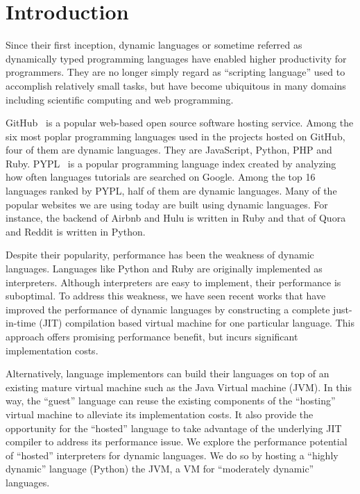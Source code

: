 \chapter{Introduction}
\label{chp:ch1-intro}

Since their first inception, dynamic languages or sometime referred as dynamically typed programming languages have enabled higher productivity for programmers.
They are no longer simply regard as ``scripting language'' used to accomplish relatively small tasks,
but have become ubiquitous in many domains including scientific computing and web programming.

GitHub~\cite{github} is a popular web-based open source software hosting service.
Among the six most poplar programming languages used in the projects hosted on GitHub, four of them are dynamic languages.
They are JavaScript, Python, PHP and Ruby.
PYPL~\cite{pypl} is a popular programming language index created by analyzing how often languages tutorials are searched on Google.
Among the top 16 languages ranked by PYPL, half of them are dynamic languages.
Many of the popular websites we are using today are built using dynamic languages.
For instance, the backend of Airbnb and Hulu is written in Ruby and that of Quora and Reddit is written in Python.

Despite their popularity, performance has been the weakness of dynamic languages.
Languages like Python and Ruby are originally implemented as interpreters.
Although interpreters are easy to implement, their performance is suboptimal.
To address this weakness, we have seen recent works that have improved the performance of dynamic languages
by constructing a complete just-in-time (JIT) compilation based virtual machine for one particular language.
This approach offers promising performance benefit, but incurs significant implementation costs.

Alternatively, language implementors can build their languages on top of an existing mature virtual machine such as the Java Virtual machine (JVM).
In this way, the ``guest'' language can reuse the existing components of the ``hosting'' virtual machine to alleviate its implementation costs.
It also provide the opportunity for the ``hosted'' language to take advantage of the underlying JIT compiler to address its performance issue.
We explore the performance potential of ``hosted'' interpreters for dynamic languages.
We do so by hosting a ``highly dynamic'' language (Python) the JVM, a VM for ``moderately dynamic'' languages.

